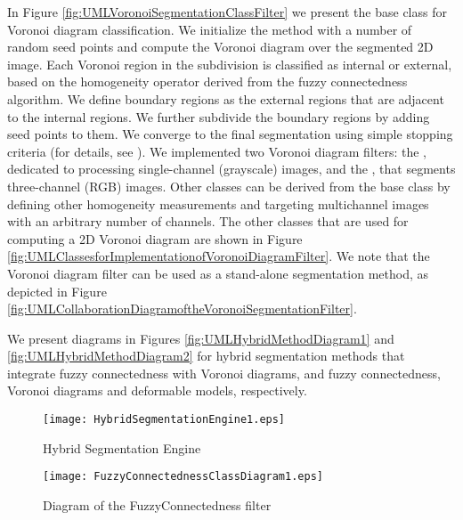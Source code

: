 In Figure \ref{fig:UMLVoronoiSegmentationClassFilter} we present the base class for
Voronoi diagram classification. We initialize the method with a number of random
seed points and compute the Voronoi diagram over the segmented 2D image. Each
Voronoi region in the subdivision is classified as internal or external,
based on the homogeneity operator derived from the fuzzy connectedness
algorithm.  We define boundary regions as the external regions that are
adjacent to the internal regions.  We further subdivide the boundary regions
by adding seed points to them. We converge to the final segmentation
using simple stopping criteria (for details, see \cite{Imielinska2001}). We
implemented two Voronoi diagram filters: the
, dedicated to processing single-channel
(grayscale) images, and the , that segments
three-channel (RGB) images. Other classes can be derived from the base class
by defining other homogeneity measurements and targeting multichannel images
with an arbitrary number of channels.  The other classes that are used for
computing a 2D Voronoi diagram are shown in Figure
\ref{fig:UMLClassesforImplementationofVoronoiDiagramFilter}. We note that the
Voronoi diagram filter can be used as a stand-alone segmentation method, as
depicted in Figure
\ref{fig:UMLCollaborationDiagramoftheVoronoiSegmentationFilter}.

 We present diagrams in Figures \ref{fig:UMLHybridMethodDiagram1} and 
 \ref{fig:UMLHybridMethodDiagram2} for hybrid segmentation methods
 that integrate fuzzy connectedness with Voronoi diagrams, and fuzzy
 connectedness, Voronoi diagrams and deformable models, respectively.


%
%
%

\begin{figure}
\center
\texttt{[image: HybridSegmentationEngine1.eps]}
\caption{Hybrid Segmentation Engine}
\label{fig:ComponentsofaHybridSegmentationApproach}
\end{figure}


\begin{figure}
\center
\texttt{[image: FuzzyConnectednessClassDiagram1.eps]}
\caption{Diagram of the FuzzyConnectedness filter}
\label{fig:UMLClassDiagramoftherFuzzyConnectednessFilter}
\end{figure}


